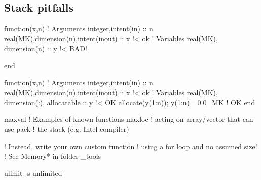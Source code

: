 \documentclass{article}
\begin{document}
\subsection{Stack pitfalls}
\begin{codea}
function(x,n)
! Arguments
integer,intent(in) :: n
real(MK),dimension(n),intent(inout) :: x !< ok
! Variables
real(MK), dimension(n) :: y !< BAD!

end
\end{codea} 
\begin{codeb}
function(x,n)
! Arguments
integer,intent(in) :: n
real(MK),dimension(n),intent(inout) :: x !< ok
! Variables
real(MK), dimension(:), allocatable :: y !< OK
allocate(y(1:n)); y(1:n)= 0.0_MK         !  OK
end
\end{codeb}
\begin{codea}
maxval  ! Examples of known functions 
maxloc  ! acting on array/vector that can use
pack    ! the stack (e.g. Intel compiler)
\end{codea} 
\begin{codeb}
! Instead, write your own custom function
! using a for loop and no assumed size!
! See Memory* in folder _tools
\end{codeb}
\begin{codea}
\end{codea} 
\begin{codeb}
ulimit -s unlimited
\end{codeb}


\end{document}
